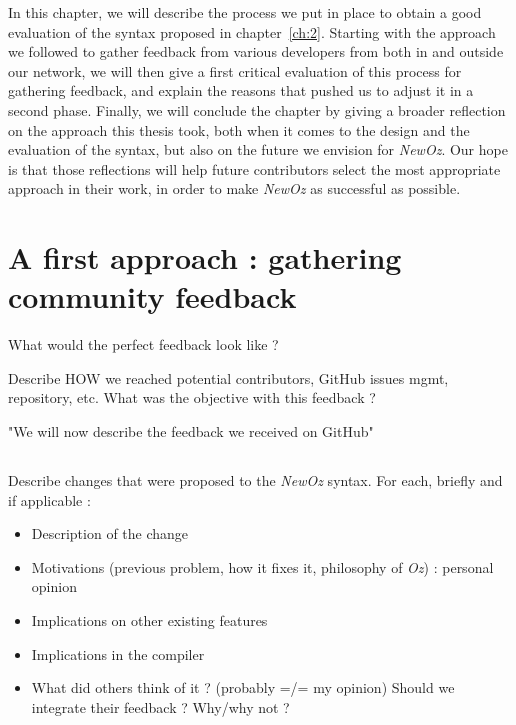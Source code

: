 
In this chapter, we will describe the process we put in place to obtain a good evaluation of the syntax proposed in chapter~\ref{ch:2}.
Starting with the approach we followed to gather feedback from various developers  from both in and outside our network,
we will then give a first critical evaluation of this process for gathering feedback, and explain the reasons that pushed us to adjust it in a second phase.
Finally, we will conclude the chapter by giving a broader reflection on the approach this thesis took, both when it comes to the design and the evaluation of the syntax, but also on the future we envision for \textit{NewOz}.
Our hope is that those reflections will help future contributors select the most appropriate approach in their work, in order to make \textit{NewOz} as successful as possible.

\section{A first approach : gathering community feedback}\label{sec:ch4-GitHub}
What would the perfect feedback look like ?\newline

Describe HOW we reached potential contributors, GitHub issues mgmt, repository, etc.
What was the objective with this feedback ?\newline

"We will now describe the feedback we received on GitHub"
\subsection{}
Describe changes that were proposed to the \textit{NewOz} syntax.
For each, briefly and if applicable :
\begin{itemize}
    \item Description of the change
    \item Motivations (previous problem, how it fixes it, philosophy of \textit{Oz}) : personal opinion
    \item Implications on other existing features
    \item Implications in the compiler
    \item What did others think of it ? (probably =/= my opinion) Should we integrate their feedback ? Why/why not ?
\end{itemize}

